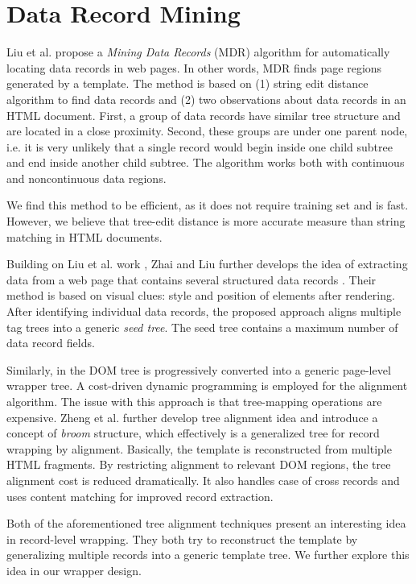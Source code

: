 \section{Data Record Mining}

Liu et al. \cite{liu2009a} propose a \emph{Mining Data Records} (MDR) algorithm for automatically locating data records in web pages. In other words, MDR finds page regions generated by a template. The method is based on (1) string edit distance algorithm to find data records and (2) two observations about data records in an HTML document. First, a group of data records have similar tree structure and are located in a close proximity. Second, these groups are under one parent node, i.e. it is very unlikely that a single record would begin inside one child subtree and end inside another child subtree. The algorithm works both with continuous and noncontinuous data regions. 

We find this method to be efficient, as it does not require training set and is fast. However, we believe that tree-edit distance is more accurate measure than string matching in HTML documents.

Building on Liu et al. work \cite{liu2009a}, Zhai and Liu further develops the idea of extracting data from a web page that contains several structured data records \cite{zhai2005a}. Their method is based on visual clues: style and position of elements after rendering. After identifying individual data records, the proposed approach aligns multiple tag trees into a generic \emph{seed tree}. The seed tree contains a maximum number of data record fields.

Similarly, in \cite{zheng2007a} the DOM tree is progressively converted into a generic page-level wrapper tree. A cost-driven dynamic programming is employed for the alignment algorithm. The issue with this approach is that tree-mapping operations are expensive. Zheng et al. further develop tree alignment idea \cite{DBLP:conf/cikm/ZhengSWG09} and introduce a concept of \emph{broom} structure, which effectively is a generalized tree for record wrapping by alignment. Basically, the template is reconstructed from multiple HTML fragments. By restricting alignment to relevant DOM regions, the tree alignment cost is reduced dramatically. It also handles case of cross records and uses content matching for improved record extraction.

Both of the aforementioned tree alignment techniques present an interesting idea in record-level wrapping. They both try to reconstruct the template by generalizing multiple records into a generic template tree. We further explore this idea in our wrapper design.


